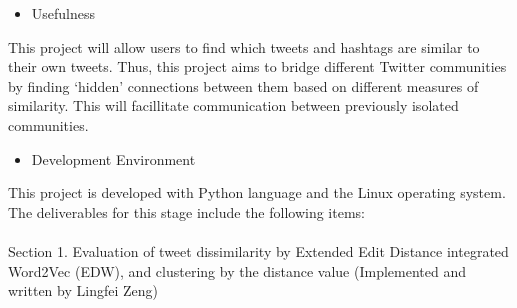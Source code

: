\documentclass[10pt]{article}
\begin{document}
\begin{itemize}
	\item Usefulness
\end{itemize}
This project will allow users to find which tweets and hashtags are similar to their own tweets. Thus, this project aims to bridge different Twitter communities by finding ‘hidden’ connections between them based on different measures of similarity. This will facillitate communication between previously isolated communities.
\begin{itemize}
	\item Development Environment
\end{itemize}	
This project is developed with Python language and the Linux operating system. \\
The deliverables for this stage include the following items:\\\\
Section 1. Evaluation of tweet dissimilarity by Extended Edit Distance integrated Word2Vec (EDW), and clustering by the distance value (Implemented and written by Lingfei Zeng)
\end{document}
